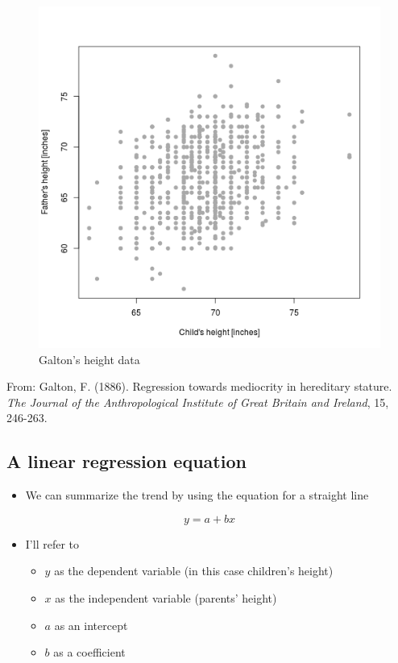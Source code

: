 \documentclass[12pt,twoside]{article}
\providecommand{\tightlist}{%
  \setlength{\itemsep}{0pt}\setlength{\parskip}{0pt}}
\begin{document}
\begin{figure}[htbp]
\centering
\includegraphics{figure/galtonfig-1.png}
\caption{Galton's height data}
\end{figure}

From: Galton, F. (1886). Regression towards mediocrity in hereditary
stature. \emph{The Journal of the Anthropological Institute of Great
Britain and Ireland}, 15, 246-263.

\subsection{A linear regression
equation}\label{a-linear-regression-equation}

\begin{itemize}
\tightlist
\item
  We can summarize the trend by using the equation for a straight line
\end{itemize}

\[
y = a + bx
\]

\begin{itemize}
\tightlist
\item
  I'll refer to

  \begin{itemize}
  \tightlist
  \item
    \(y\) as the dependent variable (in this case children's height)
  \item
    \(x\) as the independent variable (parents' height)
  \item
    \(a\) as an intercept
  \item
    \(b\) as a coefficient
  \end{itemize}
\end{itemize}
\end{document}
